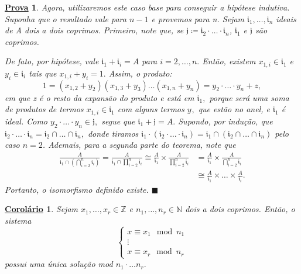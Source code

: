 \documentclass{article}
\newtheorem*{proof*}{\underline{Prova}}
\newtheorem*{crl*}{\underline{Corolário}}
\renewcommand\qedsymbol{$\blacksquare$}
\begin{document}
\begin{proof*}
      Agora, utilizaremos este caso base para conseguir a hipótese indutiva. Suponha que o resultado vale para \(n-1\) e provemos para n.
      Sejam \(\mathfrak{i}_{1}, \dotsc, \mathfrak{i}_{n}\) ideais de A dois a dois coprimos. Primeiro, note que,
      se \(\mathfrak{j}\coloneqq \mathfrak{i}_{2}\cdot \dotsc \cdot \mathfrak{i}_{n}\), \(\mathfrak{i}_{1}\) e \(\mathfrak{j}\) são coprimos.

      De fato, por hipótese, vale \(\mathfrak{i}_{1}+\mathfrak{i}_{i} = A\) para \(i=2, \dotsc, n.\) Então, existem
      \(x_{1, i}\in \mathfrak{i}_{1}\) e \(y_{i}\in \mathfrak{i}_{i}\) tais que \(x_{1, i}+y_{i} = 1.\) Assim, o produto:
      \[
        1 = (x_{1, 2} + y_{2})(x_{1, 3}+y_{3})\dotsc(x_{1, n}+y_{n}) = y_{2}\cdot \dotsc \cdot y_{n}+z,
      \]
      em que z é o resto da expansão do produto e está em \(\mathfrak{i}_{1},\) porque será uma soma de produtos de termos \(x_{1, i}\in \mathfrak{i}_{1}\) com alguns 
      termos \(y_{},\) que estão no anel, e \(\mathfrak{i}_{1}\) é ideal. Como \(y_{2}\cdot \dotsc \cdot y_{n}\in \mathfrak{j},\) segue que  \(\mathfrak{i}_{1} + \mathfrak{j} = A.\)
      Supondo, por indução, que \(\mathfrak{i}_{2}\cdot \dotsc \cdot \mathfrak{i}_{n} = \mathfrak{i}_{2}\cap \dotsc \cap \mathfrak{i}_{n},\) donde tiramos
      \(\mathfrak{i}_{1}\cdot (\mathfrak{i}_{2}\cdot \dotsc \cdot \mathfrak{i}_{n}) = \mathfrak{i}_{1}\cap (\mathfrak{i}_{2}\cap \dotsc\cap \mathfrak{i}_{n})\) pelo caso \(n=2\).
      Ademais, para a segunda parte do teorema, note que 
      \begin{align*}
        \frac{A}{\mathfrak{i}_{1}\cap(\bigcap_{i=2}^{n}\mathfrak{i}_{i})} = \frac{A}{\mathfrak{i}_{1}\cap \prod\limits_{i=2}^{n}\mathfrak{i}_{i}}\cong \frac{A}{\mathfrak{i}_{1}}\times \frac{A}{\prod\limits_{i=2}^{n}\mathfrak{i}_{i}}&=\frac{A}{\mathfrak{i}_{1}}\times \frac{A}{\bigcap_{i=2}^{n}\mathfrak{i}_{i}}\\  
                                                                                                                                                                                                                                        &\cong \frac{A}{\mathfrak{i}_{1}}\times \dotsc\times \frac{A}{\mathfrak{i}_{i}}.
      \end{align*}
      Portanto, o isomorfismo definido existe. \qedsymbol
    \end{proof*}
    \begin{crl*}
      Sejam \(x_{1}, \dotsc, x_{r}\in \mathbb{Z}\) e \(n_{1}, \dotsc, n_{r}\in \mathbb{N}\) dois a dois coprimos. Então,
      o sistema 
      \begin{equation*}
        \left\{\begin{array}{ll}
            x\equiv x_{1}\mod n_{1}\\
            \vdots\\
            x\equiv x_{r}\mod n_{r}
        \end{array}\right.
      \end{equation*}
      possui uma única solução mod \(n_{1}\cdot \dotsc n_{r}.\)
    \end{crl*}
\end{document}
